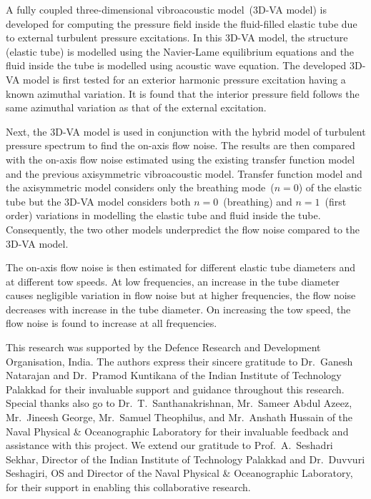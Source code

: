 \documentclass[twocolumn,10pt]{asme2ej}
\begin{document}
A fully coupled three-dimensional vibroacoustic model~(3D-VA model) is developed for computing the pressure field inside the fluid-filled elastic tube due to external turbulent pressure excitations. In this 3D-VA model, the structure (elastic tube) is modelled using the Navier-Lame equilibrium equations and the fluid inside the tube is modelled using acoustic wave equation. The developed 3D-VA model is first tested for an exterior harmonic pressure excitation having a known azimuthal variation. It is found that the interior pressure field follows the same azimuthal variation as that of the external excitation.

Next, the 3D-VA model is used in conjunction with the hybrid model of turbulent pressure spectrum to find the on-axis flow noise. The results are then compared with the on-axis flow noise estimated using the existing transfer function model~\cite{knight1996} and the previous axisymmetric vibroacoustic model. Transfer function model and the axisymmetric model considers only the breathing mode~($n=0$) of the elastic tube but the 3D-VA model considers both $n=0$~(breathing) and $n=1$~(first order) variations in modelling the elastic tube and fluid inside the tube. Consequently, the two other models underpredict the flow noise compared to the 3D-VA model.

The on-axis flow noise is then estimated for different elastic tube diameters and at different tow speeds. At low frequencies, an increase in the tube diameter causes negligible variation in flow noise but at higher frequencies, the flow noise decreases with increase in the tube diameter. On increasing the tow speed, the flow noise is found to increase at all frequencies.


\begin{acknowledgment}
This research was supported by the Defence Research and Development Organisation, India. The authors express their sincere gratitude to Dr.~Ganesh Natarajan and Dr.~Pramod Kuntikana of the Indian Institute of Technology Palakkad for their invaluable support and guidance throughout this research. Special thanks also go to Dr.~T.~Santhanakrishnan, Mr.~Sameer Abdul Azeez, Mr.~Jineesh George, Mr.~Samuel Theophilus, and Mr.~Anshath Hussain of the Naval Physical \& Oceanographic Laboratory for their invaluable feedback and assistance with this project. We extend our gratitude to Prof.~A.~Seshadri Sekhar, Director of the Indian Institute of Technology Palakkad and Dr.~Duvvuri Seshagiri, OS and Director of the Naval Physical \& Oceanographic Laboratory, for their support in enabling this collaborative research.
\end{acknowledgment}
\end{document}
